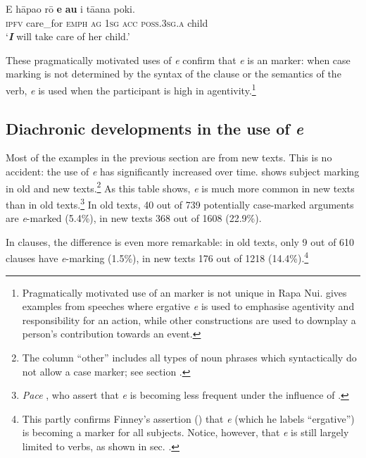 {\ea\label{ex:8.23}
\gll E hāpa{\ꞌ}o rō \textbf{e} \textbf{au} i tā{\ꞌ}ana poki.\\
\textsc{ipfv} care\_for \textsc{emph} \textsc{ag} \textsc{1sg} \textsc{acc} \textsc{poss.3sg.a} child\\

\glt
‘\textit{\textbf{I}} will take care of her child.’ \textstyleExampleref{[R229.081]} 
\z

These pragmatically motivated uses of \textit{e} confirm that \textit{e} is an  marker: when case marking is not determined by the syntax of the clause or the semantics of the verb, \textit{e} is used when the participant is high in agentivity.\footnote{\label{fn:400}Pragmatically motivated use of an  marker is not unique in Rapa Nui. \citet{Duranti1990,Duranti1994} gives examples from  speeches where ergative \textit{e} is used to emphasise agentivity and responsibility for an action, while other constructions are used to downplay a person’s contribution towards an event.}

\subsection[Diachronic developments in the use of e]{Diachronic developments in the use of \textit{e}}\label{sec:8.3.1.5}


Most of the examples in the previous section are from new texts. This is no accident: the use of \textit{e} has significantly increased over time.  shows subject marking in old and new texts.\footnote{\label{fn:401}The column “other” includes all types of noun phrases which syntactically do not allow a case marker; see section .} As this table shows, \textit{e} is much more common in new texts than in old texts.\footnote{\label{fn:402}\textit{Pace} \citet[31]{FinneyAlexander1998}, who assert that \textit{e} is becoming less frequent under the influence of .}  In old texts, 40 out of 739 potentially case-marked arguments are \textit{e}{}-marked (5.4\%), in new texts 368 out of 1608 (22.9\%). 
\newpage 

In  clauses, the difference is even more remarkable: in old texts, only 9 out of 610  clauses have \textit{e}{}-marking (1.5\%), in new texts 176 out of 1218 (14.4\%).\footnote{\label{fn:403}This partly confirms Finney’s assertion (\citealt[409]{Finney2001}) that \textit{e} (which he labels “ergative”) is becoming a marker for all subjects. Notice, however, that \textit{e} is still largely limited to  verbs, as shown in sec. .} 

}
